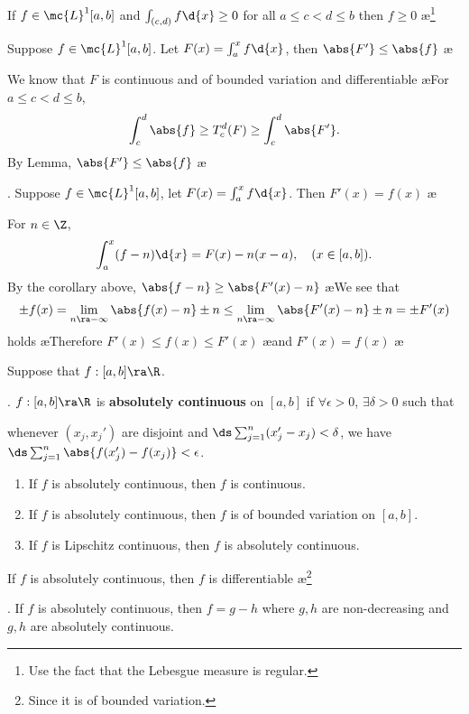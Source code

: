\lemma If \(f \in \mc{L}^{1}[a, b]\) and \(\int_{(c, d)} f\d{x} \geq 0\) for all \(a\leq c<d\leq b\) then \(f\geq 0\) \ae\footnote{Use the fact that the Lebesgue measure is regular.}

\cor Suppose \(f \in \mc{L}^{1}[a, b]\). Let \(F(x) = \int_a^x f\d{x}\), then \(\abs{F'} \leq \abs{f}\) \ae

\pf We know that \(F\) is continuous and of bounded variation and differentiable \ae For \(a\leq c < d \leq b\),
\[
    \int_c^d \abs{f} \geq T_c^d (F) \geq \int_c^d \abs{F'}.
\]
By Lemma, \(\abs{F'}\leq \abs{f}\) \ae

\thm.  Suppose \(f \in \mc{L}^{1}[a, b]\), let \(F(x) = \int_a^x f\d{x}\). Then \(F'(x) = f(x)\) \ae

\pf For \(n \in \Z\),
\[
    \int_a^x (f - n)\d{x} = F(x) - n(x - a), \quad (x \in [a, b]).
\]
By the corollary above, \(\abs{f - n} \geq \abs{F'(x) - n}\) \ae We see that
\[
    \pm f(x) = \lim_{n \ra -\infty} \abs{f(x) - n} \pm n \leq \lim_{n \ra -\infty} \abs{F'(x) - n} \pm n = \pm F'(x)
\]
holds \ae Therefore \(F'(x) \leq f(x) \leq F'(x)\) \ae and \(F'(x) = f(x)\) \ae


Suppose that \(f : [a, b] \ra \R\).

.  \(f: [a, b] \ra \R\) is \textbf{absolutely continuous} on \([a, b]\) if \(\forall \epsilon > 0\), \(\exists \delta > 0\) such that
\begin{center}
    whenever \((x_j, x_j')\) are disjoint and \(\ds \sum_{j=1}^{n}(x_j' - x_j) < \delta\), we have \(\ds \sum_{j=1}^{n} \abs{f(x_j') - f(x_j)} < \epsilon\).
\end{center}

\rmk
\begin{enumerate}
    \item If \(f\) is absolutely continuous, then \(f\) is continuous.
    \item If \(f\) is absolutely continuous, then \(f\) is of bounded variation on \([a, b]\).
    \item If \(f\) is Lipschitz continuous, then \(f\) is absolutely continuous.
\end{enumerate}

\cor If \(f\) is absolutely continuous, then \(f\) is differentiable \ae\footnote{Since it is of bounded variation.}

\thm. If \(f\) is absolutely continuous, then \(f = g - h\) where \(g, h\) are non-decreasing and \(g, h\) are absolutely continuous.


